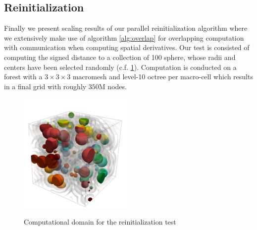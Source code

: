\subsection{Reinitialization} \label{section::scaling_reinitialization}

Finally we present scaling results of our parallel reinitialization algorithm where we extensively make use of algorithm \ref{alg:overlap} for overlapping computation with communication when computing spatial derivatives. Our test is consisted of computing the signed distance to a collection of 100 sphere, whose radii and centers have been selected randomly (c.f. \ref{fig:reinit}). Computation is conducted on a forest with a $3\times3\times3$ macromesh and level-10 octree per macro-cell which results in a final grid with roughly $350$M nodes.
\begin{figure}
\centering
\includegraphics[width=0.5\textwidth]{figures/reinit.png}
\label{fig:reinit}
\caption{Computational domain for the reinitialization test}
\end{figure}